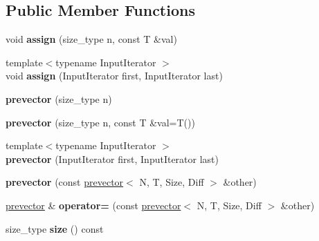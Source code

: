 \subsection*{Public Member Functions}
\begin{DoxyCompactItemize}
\item 
\mbox{\label{classprevector_aecbf4de43de23c1b01a2e39bf974f14e}} 
void {\bfseries assign} (size\+\_\+type n, const T \&val)
\item 
\mbox{\label{classprevector_a8bb8dd8d722522a475b6a36bc93cd8c1}} 
{\footnotesize template$<$typename Input\+Iterator $>$ }\\void {\bfseries assign} (Input\+Iterator first, Input\+Iterator last)
\item 
\mbox{\label{classprevector_a0c428e879c43daac251d6fbbc2ab7b54}} 
{\bfseries prevector} (size\+\_\+type n)
\item 
\mbox{\label{classprevector_a044c7d0d417476bb08cc8c9b33755cac}} 
{\bfseries prevector} (size\+\_\+type n, const T \&val=T())
\item 
\mbox{\label{classprevector_a1f97e987163b5d6525168ed8e4229fe9}} 
{\footnotesize template$<$typename Input\+Iterator $>$ }\\{\bfseries prevector} (Input\+Iterator first, Input\+Iterator last)
\item 
\mbox{\label{classprevector_abab195dce86a4b44bab7a5e9809a522c}} 
{\bfseries prevector} (const \mbox{\hyperlink{classprevector}{prevector}}$<$ N, T, Size, Diff $>$ \&other)
\item 
\mbox{\label{classprevector_a325af27672f21e7f2a01d8cdae7abba8}} 
\mbox{\hyperlink{classprevector}{prevector}} \& {\bfseries operator=} (const \mbox{\hyperlink{classprevector}{prevector}}$<$ N, T, Size, Diff $>$ \&other)
\item 
\mbox{\label{classprevector_a626f7d206dbc24e5610631809762758b}} 
size\+\_\+type {\bfseries size} () const
\item 
\mbox{\label{classprevector_a0057a2d5ac2bbff636af5fbd87ae5235}} 

\end{DoxyCompactItemize}
